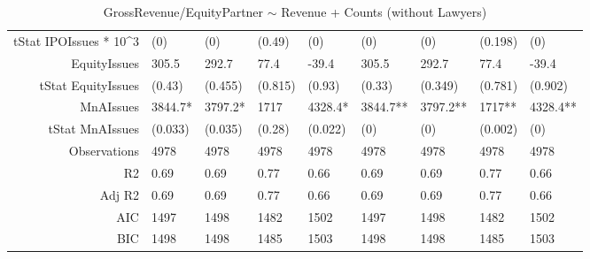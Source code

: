 \begin{table}[ht]
\begin{tabular}{rllllllll}
  tStat IPOIssues * 10^3 & (0) & (0) & (0.49) & (0) & (0) & (0) & (0.198) & (0) \\ 
  EquityIssues & 305.5 & 292.7 & 77.4 & -39.4 & 305.5 & 292.7 & 77.4 & -39.4 \\ 
  tStat EquityIssues & (0.43) & (0.455) & (0.815) & (0.93) & (0.33) & (0.349) & (0.781) & (0.902) \\ 
  MnAIssues & 3844.7* & 3797.2* & 1717 & 4328.4* & 3844.7** & 3797.2** & 1717** & 4328.4** \\ 
  tStat MnAIssues & (0.033) & (0.035) & (0.28) & (0.022) & (0) & (0) & (0.002) & (0) \\ 
  Observations & 4978 & 4978 & 4978 & 4978 & 4978 & 4978 & 4978 & 4978 \\ 
  R2 & 0.69 & 0.69 & 0.77 & 0.66 & 0.69 & 0.69 & 0.77 & 0.66 \\ 
  Adj R2 & 0.69 & 0.69 & 0.77 & 0.66 & 0.69 & 0.69 & 0.77 & 0.66 \\ 
  AIC & 1497 & 1498 & 1482 & 1502 & 1497 & 1498 & 1482 & 1502 \\ 
  BIC & 1498 & 1498 & 1485 & 1503 & 1498 & 1498 & 1485 & 1503 \\ 
   \hline
\end{tabular}
\caption{GrossRevenue/EquityPartner $\sim$ Revenue + Counts (without Lawyers)} 
\end{table}
